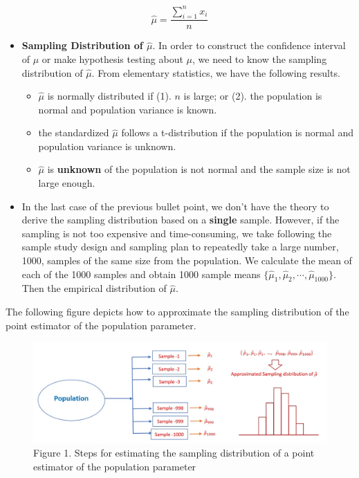 \documentclass[
]{book}
\begin{document}
\[\hat{\mu} = \frac{\sum_{i=1}^n x_i}{n}\]

\begin{itemize}
\item
  \textbf{Sampling Distribution of \(\hat{\mu}\)}. In order to construct the confidence interval of \(\mu\) or make hypothesis testing about \(\mu\), we need to know the sampling distribution of \(\hat{\mu}\). From elementary statistics, we have the following results.

  \begin{itemize}
  \item
    \(\hat{\mu}\) is normally distributed if (1). \(n\) is large; or (2). the population is normal and population variance is known.
  \item
    the standardized \(\hat{\mu}\) follows a t-distribution if the population is normal and population variance is unknown.
  \item
    \(\hat{\mu}\) is \textbf{unknown} of the population is not normal and the sample size is not large enough.
  \end{itemize}
\item
  In the last case of the previous bullet point, we don't have the theory to derive the sampling distribution based on a \textbf{single} sample. However, if the sampling is not too expensive and time-consuming, we take following the sample study design and sampling plan to repeatedly take a large number, 1000, samples of the same size from the population. We calculate the mean of each of the 1000 samples and obtain 1000 sample means \(\{\hat{\mu}_1, \hat{\mu}_2, \cdots, \hat{\mu}_{1000}\}\). Then the empirical distribution of \(\hat{\mu}\).
\end{itemize}

The following figure depicts how to approximate the sampling distribution of the point estimator of the population parameter.

\begin{figure}

{\centering \includegraphics[width=0.6\linewidth]{img05/w05-ApproxSamplingDist} 

}

\caption{Figure 1. Steps for estimating the sampling distribution of a point estimator of the population parameter}\label{fig:unnamed-chunk-105}
\end{figure}
\end{document}
